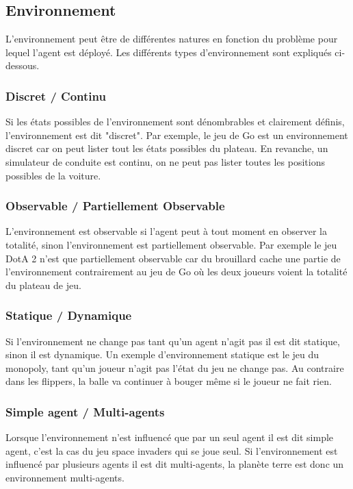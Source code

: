 \documentclass{article}
\begin{document}
\subsection{Environnement}

L'environnement peut être de différentes natures en fonction du problème pour lequel l'agent est déployé. Les différents types d'environnement sont expliqués ci-dessous.

\subsubsection{Discret / Continu}

Si les états possibles de l'environnement sont dénombrables et clairement définis, l'environnement est dit "discret". Par exemple, le jeu de Go est un environnement discret car on peut lister tout les états possibles du plateau. En revanche, un simulateur de conduite est continu, on ne peut pas lister toutes les positions possibles de la voiture\cite{tutoptai}.

\subsubsection{Observable / Partiellement Observable}

L'environnement est observable si l'agent peut à tout moment en observer la totalité, sinon l'environnement est partiellement observable. Par exemple le jeu DotA 2 n'est que partiellement observable car du brouillard cache une partie de l'environnement contrairement au jeu de Go où les deux joueurs voient la totalité du plateau de jeu\cite{tutoptai}.

\subsubsection{Statique / Dynamique}

Si l'environnement ne change pas tant qu'un agent n'agit pas il est dit statique, sinon il est dynamique. Un exemple d'environnement statique est le jeu du monopoly, tant qu'un joueur n'agit pas l'état du jeu ne change pas. Au contraire dans les flippers, la balle va continuer à bouger même si le joueur ne fait rien\cite{tutoptai}.

\subsubsection{Simple agent / Multi-agents}

Lorsque l'environnement n'est influencé que par un seul agent il est dit simple agent, c'est la cas du jeu space invaders qui se joue seul. Si l'environnement est influencé par plusieurs agents il est dit multi-agents, la planète terre est donc un environnement multi-agents\cite{tutoptai}.
\end{document}
